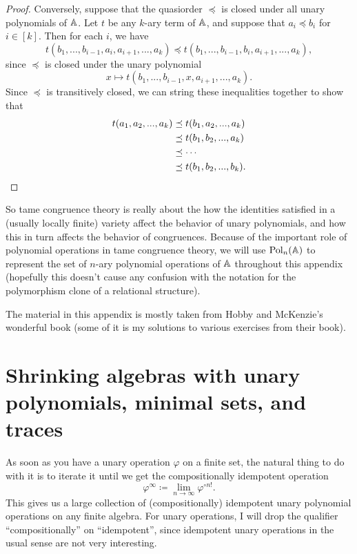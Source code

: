 \begin{appendices}
\begin{proof}
Conversely, suppose that the quasiorder $\preceq$ is closed under all unary polynomials of $\mathbb{A}$. Let $t$ be any $k$-ary term of $\mathbb{A}$, and suppose that $a_i \preceq b_i$ for $i \in [k]$. Then for each $i$, we have
\[
t(b_1, ..., b_{i-1}, a_i, a_{i+1}, ..., a_k) \preceq t(b_1, ..., b_{i-1}, b_i, a_{i+1}, ..., a_k),
\]
since $\preceq$ is closed under the unary polynomial
\[
x \mapsto t(b_1, ..., b_{i-1}, x, a_{i+1}, ..., a_k).
\]
Since $\preceq$ is transitively closed, we can string these inequalities together to show that
\begin{align*}
t(a_1, a_2, ..., a_k) &\preceq t(b_1, a_2, ..., a_k)\\
&\preceq t(b_1, b_2, ..., a_k)\\
&\preceq \cdots\\
&\preceq t(b_1, b_2, ..., b_k).\qedhere
\end{align*}
\end{proof}

So tame congruence theory is really about the how the identities satisfied in a (usually locally finite) variety affect the behavior of unary polynomials, and how this in turn affects the behavior of congruences. Because of the important role of polynomial operations in tame congruence theory, we will use $\operatorname{Pol}_n(\mathbb{A})$ to represent the set of $n$-ary polynomial operations of $\mathbb{A}$ throughout this appendix (hopefully this doesn't cause any confusion with the notation for the polymorphism clone of a relational structure).

The material in this appendix is mostly taken from Hobby and McKenzie's wonderful book \cite{hobby-mckenzie} (some of it is my solutions to various exercises from their book).


\section{Shrinking algebras with unary polynomials, minimal sets, and traces}

As soon as you have a unary operation $\varphi$ on a finite set, the natural thing to do with it is to iterate it until we get the compositionally idempotent operation
\[
\varphi^{\infty} \coloneqq \lim_{n\rightarrow \infty} \varphi^{\circ n!}.
\]
This gives us a large collection of (compositionally) idempotent unary polynomial operations on any finite algebra. For unary operations, I will drop the qualifier ``compositionally'' on ``idempotent'', since idempotent unary operations in the usual sense are not very interesting.


\end{appendices}
